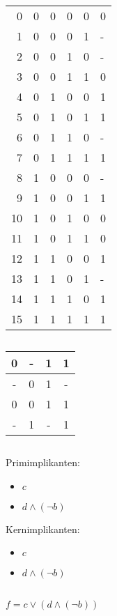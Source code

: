 \documentclass{article}
\begin{document}
\section{}
\begin{tabular}{r|cccc|l}
    0&0&0&0&0&0\\
    1&0&0&0&1&-\\
    2&0&0&1&0&-\\
    3&0&0&1&1&0\\
    4&0&1&0&0&1\\
    5&0&1&0&1&1\\
    6&0&1&1&0&-\\
    7&0&1&1&1&1\\
    8&1&0&0&0&-\\
    9&1&0&0&1&1\\
    10&1&0&1&0&0\\
    11&1&0&1&1&0\\
    12&1&1&0&0&1\\
    13&1&1&0&1&-\\
    14&1&1&1&0&1\\
    15&1&1&1&1&1\\
\end{tabular}
\subsection{}
\begin{tabular}{c|c|c|c}
    0&-&1&1\\
    \hline
    -&0&1&-\\
    \hline
    0&0&1&1\\
    \hline
    -&1&-&1\\
\end{tabular}
\subsection{}
Primimplikanten:
\begin{itemize}
    \item $c$
    \item $d\land(\neg b)$
\end{itemize}
Kernimplikanten:
\begin{itemize}
    \item $c$
    \item $d\land(\neg b)$
\end{itemize}
\subsection{}
$f=c\lor (d \land (\neg b))$
\end{document}
